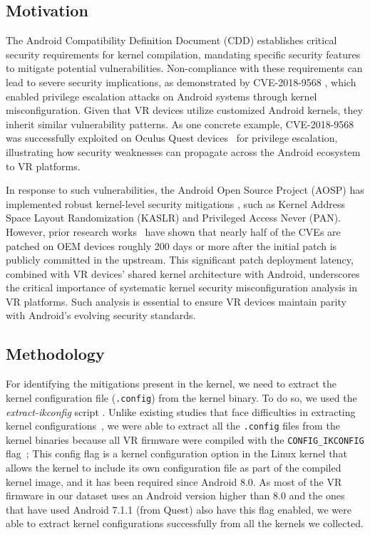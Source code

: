 \documentclass[sigconf]{acmart}
\newcommand{\cc}[1]{\mbox{\smaller[0.5]\texttt{#1}}}
\begin{document}
\subsection{Motivation}
The Android Compatibility Definition Document (CDD) \cite{android_cdd} establishes critical security requirements for kernel compilation, mandating specific security features to mitigate potential vulnerabilities. Non-compliance with these requirements can lead to severe security implications, as demonstrated by CVE-2018-9568 \cite{CVE-9568}, which enabled privilege escalation attacks on Android systems through kernel misconfiguration. Given that VR devices utilize customized Android kernels, they inherit similar vulnerability patterns.
As one concrete example, CVE-2018-9568 was successfully exploited on Oculus Quest devices~\cite{Github-9568} for privilege escalation, illustrating how security weaknesses can propagate across the Android ecosystem to VR platforms.

In response to such vulnerabilities, the Android Open Source Project (AOSP) has implemented robust kernel-level security mitigations \cite{Google-blog}, such as Kernel Address Space Layout Randomization (KASLR) and Privileged Access Never (PAN). 
However, prior research works~\cite{zhang2021investigation} have shown that nearly half of the CVEs are patched on OEM devices roughly 200 days or more after the initial patch is publicly committed in the upstream.
This significant patch deployment latency, combined with VR devices' shared kernel architecture with Android, underscores the critical importance of systematic kernel security misconfiguration analysis in VR platforms. Such analysis is essential to ensure VR devices maintain parity with Android's evolving security standards.

\subsection{Methodology}
For identifying the mitigations present in the kernel, we need to extract the kernel configuration file (\cc{.config})  from the kernel binary. 
To do so, we used the \textit{extract-ikconfig} script \cite{extract-ikconfig}. 
Unlike existing studies that face difficulties in extracting kernel configurations~\cite{yut,possemato2021trust},
we were able to extract all the \cc{.config} files from the kernel binaries because all VR firmware were compiled with the \cc{CONFIG\_IKCONFIG} flag~\cite{ikconfig_lkddb};
This config flag is a kernel configuration option in the Linux kernel that allows the kernel to include its own configuration file as part of the compiled kernel image, and it has been required since Android 8.0. 
As most of the VR firmware in our dataset uses an Android version higher than 8.0 and the ones that have used Android 7.1.1 (from Quest) also have this flag enabled, we were able to extract kernel configurations successfully from all the kernels we collected. 
\end{document}
